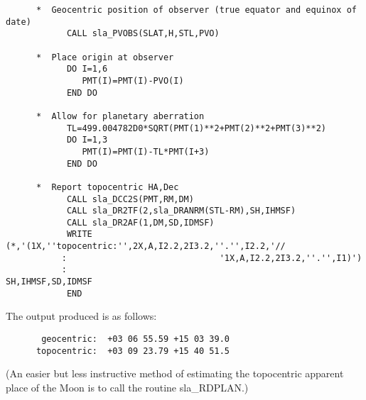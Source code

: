 \documentclass[11pt,twoside]{article}
\begin{document}
\begin{verbatim}
      *  Geocentric position of observer (true equator and equinox of date)
            CALL sla_PVOBS(SLAT,H,STL,PVO)

      *  Place origin at observer
            DO I=1,6
               PMT(I)=PMT(I)-PVO(I)
            END DO

      *  Allow for planetary aberration
            TL=499.004782D0*SQRT(PMT(1)**2+PMT(2)**2+PMT(3)**2)
            DO I=1,3
               PMT(I)=PMT(I)-TL*PMT(I+3)
            END DO

      *  Report topocentric HA,Dec
            CALL sla_DCC2S(PMT,RM,DM)
            CALL sla_DR2TF(2,sla_DRANRM(STL-RM),SH,IHMSF)
            CALL sla_DR2AF(1,DM,SD,IDMSF)
            WRITE (*,'(1X,''topocentric:'',2X,A,I2.2,2I3.2,''.'',I2.2,'//
           :                              '1X,A,I2.2,2I3.2,''.'',I1)')
           :                                                SH,IHMSF,SD,IDMSF
            END
\end{verbatim}
\goodbreak
The output produced is as follows:
\goodbreak
\begin{verbatim}
       geocentric:  +03 06 55.59 +15 03 39.0
      topocentric:  +03 09 23.79 +15 40 51.5
\end{verbatim}
\goodbreak
(An easier but
less instructive method of estimating the topocentric apparent place of the
Moon is to call the routine
sla\_RDPLAN.)
\end{document}
